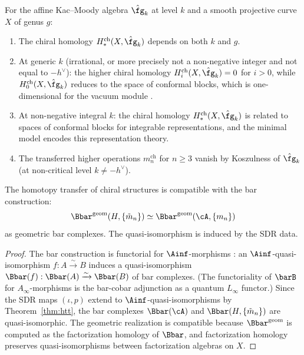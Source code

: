 \begin{example}
\label{ex:km-minimal}
For the affine Kac--Moody algebra $\hat{\fg}_k$ at level $k$ and a smooth projective curve $X$ of genus $g$:
\begin{enumerate}[label=(\roman*)]
\item The chiral homology $H^{\mathrm{ch}}_*(X, \hat{\fg}_k)$ depends on both $k$ and $g$.
\item At generic $k$ (irrational, or more precisely not a non-negative integer and not equal to $-h^\vee$): the higher chiral homology $H^{\mathrm{ch}}_i(X, \hat{\fg}_k) = 0$ for $i > 0$, while $H^{\mathrm{ch}}_0(X, \hat{\fg}_k)$ reduces to the space of conformal blocks, which is one-dimensional for the vacuum module \cite{BD04}.
\item At non-negative integral $k$: the chiral homology $H^{\mathrm{ch}}_*(X, \hat{\fg}_k)$ is related to spaces of conformal blocks for integrable representations, and the minimal model encodes this representation theory.
\item The transferred higher operations $m_n^{\mathrm{ch}}$ for $n \geq 3$
vanish by Koszulness of $\hat{\fg}_k$ (at non-critical level $k \neq -h^\vee$).
\end{enumerate}
\end{example}

\begin{proposition}
\label{prop:transfer-bar}
The homotopy transfer of chiral structures is compatible with the bar construction:
\[
\Bbar^{\mathrm{geom}}(H, \{\tilde{m}_n\}) \simeq \Bbar^{\mathrm{geom}}(\cA, \{m_n\})
\]
as geometric bar complexes. The quasi-isomorphism is induced by the SDR data.
\end{proposition}

\begin{proof}
The bar construction is functorial for $\Ainf$-morphisms \cite{LV12}: an $\Ainf$-quasi-isomorphism $f: A \xrightarrow{\sim} B$ induces a quasi-isomorphism $\Bbar(f): \Bbar(A) \xrightarrow{\sim} \Bbar(B)$ of bar complexes. (The functoriality of $\barB$ for $A_\infty$-morphisms is the bar-cobar adjunction as a quantum $L_\infty$ functor.) Since the SDR maps $(\iota, p)$ extend to $\Ainf$-quasi-isomorphisms by Theorem~\ref{thm:htt}, the bar complexes $\Bbar(\cA)$ and $\Bbar(H, \{\tilde{m}_n\})$ are quasi-isomorphic. The geometric realization is compatible because $\Bbar^{\mathrm{geom}}$ is computed as the factorization homology of $\Bbar$, and factorization homology preserves quasi-isomorphisms between factorization algebras on $X$.
\end{proof}


